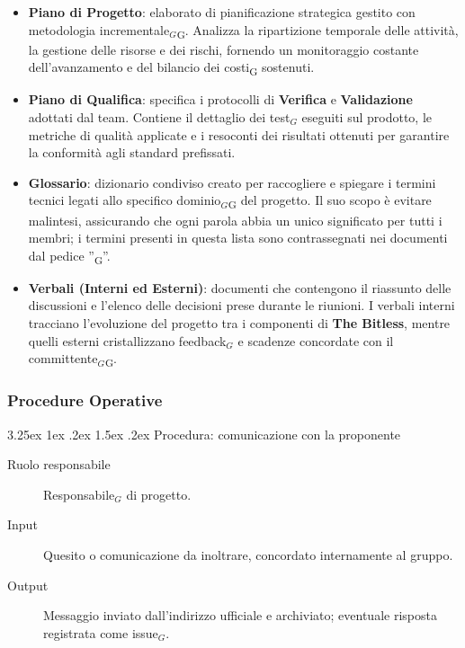 \documentclass[a4paper, 10pt]{article}
\makeatletter
\renewcommand\paragraph{\@startsection{paragraph}{4}{\z@}%
  {3.25ex \@plus1ex \@minus .2ex}%
  {1.5ex \@plus .2ex}%
  {\normalfont\normalsize\bfseries}}
\makeatother
\begin{document}
\begin{itemize}
    \item \textbf{Piano di Progetto}: elaborato di pianificazione strategica gestito con metodologia incrementale$_G$\textsubscript{G}. Analizza la ripartizione temporale delle attività, la gestione delle risorse e dei rischi, fornendo un monitoraggio costante dell'avanzamento e del bilancio dei costi\textsubscript{G} sostenuti.

    \item \textbf{Piano di Qualifica}: specifica i protocolli di \textbf{Verifica} e \textbf{Validazione} adottati dal team. Contiene il dettaglio dei test$_G$ eseguiti sul prodotto, le metriche di qualità applicate e i resoconti dei risultati ottenuti per garantire la conformità agli standard prefissati.

    \item \textbf{Glossario}: dizionario condiviso creato per raccogliere e spiegare i termini tecnici legati allo specifico dominio$_G$\textsubscript{G} del progetto. Il suo scopo è evitare malintesi, assicurando che ogni parola abbia un unico significato per tutti i membri; i termini presenti in questa lista sono contrassegnati nei documenti dal pedice ''\textsubscript{G}''.

    \item \textbf{Verbali (Interni ed Esterni)}: documenti che contengono il riassunto delle discussioni e l'elenco delle decisioni prese durante le riunioni. I verbali interni tracciano l'evoluzione del progetto tra i componenti di \textbf{The Bitless}, mentre quelli esterni cristallizzano feedback$_G$ e scadenze concordate con il committente$_G$\textsubscript{G}.
\end{itemize}

\subsubsection{Procedure Operative}

\paragraph{Procedura: comunicazione con la proponente}

\begin{description}
    \item[Ruolo responsabile] Responsabile$_G$ di progetto.
    \item[Input] Quesito o comunicazione da inoltrare, concordato internamente al gruppo.
    \item[Output] Messaggio inviato dall'indirizzo ufficiale e archiviato; eventuale risposta registrata come issue$_G$.
\end{description}
\end{document}
